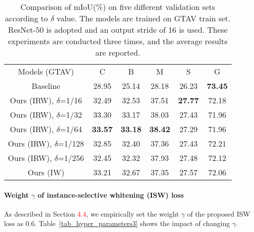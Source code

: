 \documentclass[final]{latex/cvpr}
\newcommand{\drule}{\specialrule{0.2pt}{1pt}{1pt}\specialrule{0.2pt}{0pt}{\belowrulesep}}
\newcommand{\todow}[1]{\textcolor{red}{#1}}
\begin{document}
\begin{table}[t!]
\vspace{-0.0cm}
\begin{center}
\footnotesize
\begin{tabular}{c|c|c|c|c||c}
\toprule
Models (GTAV) & C & B & M & S & G \\
\drule
Baseline & 28.95 & 25.14 & 28.18 & 26.23 & \textbf{73.45}  \\ 
\midrule
Ours (IRW), $\delta$=1$/$16 &  32.49 & 32.53 & 37.51 &  \textbf{27.77} & 72.18      \\ 
\midrule
Ours (IRW), $\delta$=1$/$32 & 33.30 & 33.17  &  38.03   &   27.43   &   71.96   \\ 
\midrule
Ours (IRW), $\delta$=1$/$64 & \textbf{33.57} & \textbf{33.18}   & \textbf{38.42}  &  27.29   &  71.96 \\ 
\midrule
Ours (IRW), $\delta$=1$/$128 & 32.85 & 32.40 & 37.36 & 27.43 & 72.21      \\ 
\midrule
Ours (IRW), $\delta$=1$/$256 & 32.45 & 32.32 & 37.93  & 27.48 & 72.12   \\ 
\midrule
Ours (IW) & 33.21 & 32.67 & 37.35 & 27.57 & 72.06 \\ 
\bottomrule
\end{tabular}
\end{center}
\vspace*{-0.2cm}
\caption{Comparison of mIoU(\%) on five different validation sets according to $\delta$ value. The models are trained on GTAV train set. ResNet-50 is adopted and an output stride of 16 is used. These experiments are conducted three times, and the average results are reported.}
\label{tab_hyper_parameters2}
\vspace{-0.2cm}
\end{table}

\paragraph{Weight $\gamma$ of instance-selective whitening (ISW) loss}
\vspace*{-0.3cm}
As described in Section \todow{4.4}, we empirically set the weight $\gamma$ of the proposed ISW loss as 0.6. Table~\ref{tab_hyper_parameters3} shows the impact of changing $\gamma$.
\end{document}
